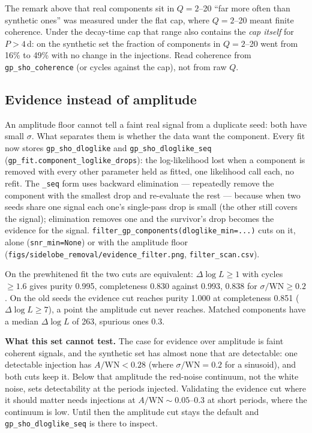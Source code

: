 \documentclass[11pt]{article}
\newcommand{\code}[1]{\texttt{#1}}
\begin{document}
The remark above that real components sit in $Q = 2$--20 ``far more often than synthetic
ones'' was measured under the flat cap, where $Q = 2$--20 meant finite coherence. Under the
decay-time cap that range also contains the \emph{cap itself} for $P > 4$\,d: on the
synthetic set the fraction of components in $Q = 2$--20 went from 16\% to 49\% with no
change in the injections. Read coherence from \code{gp\_sho\_coherence} (or cycles against
the cap), not from raw $Q$.

\subsection{Evidence instead of amplitude}
\label{sec:evidence}

An amplitude floor cannot tell a faint real signal from a duplicate seed: both have small
$\sigma$. What separates them is whether the data want the component. Every fit now stores
\code{gp\_sho\_dloglike} and \code{gp\_sho\_dloglike\_seq}
(\code{gp\_fit.component\_loglike\_drops}): the log-likelihood lost when a component is
removed with every other parameter held as fitted, one likelihood call each, no refit. The
\code{\_seq} form uses backward elimination --- repeatedly remove the component with the
smallest drop and re-evaluate the rest --- because when two seeds share one signal each one's
single-pass drop is small (the other still covers the signal); elimination removes one and the
survivor's drop becomes the evidence for the signal. \code{filter\_gp\_components(dloglike\_min=...)}
cuts on it, alone (\code{snr\_min=None}) or with the amplitude floor
(\code{figs/sidelobe\_removal/evidence\_filter.png}, \code{filter\_scan.csv}).

On the prewhitened fit the two cuts are equivalent: $\Delta\log L \ge 1$ with cycles $\ge 1.6$
gives purity 0.995, completeness 0.830 against 0.993, 0.838 for $\sigma/\mathrm{WN} \ge 0.2$.
On the old seeds the evidence cut reaches purity 1.000 at completeness 0.851
($\Delta\log L \ge 7$), a point the amplitude cut never reaches. Matched components have a
median $\Delta\log L$ of 263, spurious ones 0.3.

\textbf{What this set cannot test.} The case for evidence over amplitude is faint coherent
signals, and the synthetic set has almost none that are detectable: one detectable injection
has $A/\mathrm{WN} < 0.28$ (where $\sigma/\mathrm{WN} = 0.2$ for a sinusoid), and both cuts keep
it. Below that amplitude the red-noise continuum, not the white noise, sets detectability at
the periods injected. Validating the evidence cut where it should matter needs injections at
$A/\mathrm{WN} \sim 0.05$--0.3 at short periods, where the continuum is low. Until then the
amplitude cut stays the default and \code{gp\_sho\_dloglike\_seq} is there to inspect.
\end{document}
